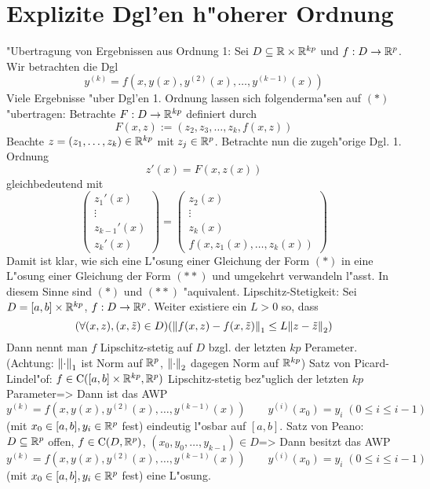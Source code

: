 \section{Explizite Dgl'en h"oherer Ordnung}
\deduction "Ubertragung von Ergebnissen aus Ordnung 1:{
  Sei $D\subseteq\mathbb R\times\mathbb R^{kp}$ und $f:D\to\mathbb R^p$. Wir 
  betrachten die Dgl
  \begin{equation*}
    \tag{*} y^{(k)}=f(x,y(x),y^{(2)}(x),\ldots,y^{(k-1)}(x))
    \end{equation*}
  Viele Ergebnisse "uber Dgl'en 1. Ordnung lassen sich folgenderma"sen auf
  $(*)$ "ubertragen: Betrachte $F:D\to\mathbb R^{kp}$ definiert durch
  \[F(x,z):=(z_2,z_3,\ldots,z_k,f(x,z))
    \]
  Beachte $z=(z_1,\ldots,z_k)\in\mathbb R^{kp}$ mit $z_j\in\mathbb R^p$. 
  Betrachte nun die zugeh"orige Dgl. 1. Ordnung
  \begin{equation*}
    \tag{**} z'(x)=F(x,z(x))
    \end{equation*}
  gleichbedeutend mit
  \[\begin{pmatrix}
      z_1'(x)\\ \vdots \\ z_{k-1}'(x) \\ z_k'(x)
      \end{pmatrix}=
    \begin{pmatrix}
      z_2(x)\\ \vdots \\ z_k(x) \\ f(x,z_1(x),\ldots,z_k(x))
      \end{pmatrix}
    \]
  Damit ist klar, wie sich eine L"osung einer Gleichung der Form $(*)$ 
  in eine L"osung einer Gleichung der Form $(**)$ und umgekehrt verwandeln
  l"asst. In diesem Sinne sind $(*)$ und $(**)$ "aquivalent.
  }
 Lipschitz-Stetigkeit:{
   Sei $D=[a,b]\times\mathbb R^{kp}$, $f:D\to\mathbb R^p$. 
   Weiter existiere ein $L>0$ so, dass
   \[(\forall (x,z),(x,\tilde z)\in D)({\left\| f(x,z)-f(x,\tilde z)\right\|}_1\leq L{\left\| z-\tilde z\right\|}_2)
     \]
   Dann nennt man $f$ Lipschitz-stetig auf $D$ bzgl. der letzten 
   $kp$ Perameter. 
   (Achtung: ${\left\| \cdot\right\|}_1$ ist Norm auf $\mathbb R^p$, ${\left\| \cdot\right\|}_2$ dagegen
   Norm auf $\mathbb R^{kp}$)
   }
\theorem Satz von Picard-Lindel"of:
  $f\in{\rm C}([a,b]\times\mathbb R^{kp},\mathbb R^{p})$ Lipschitz-stetig bez"uglich
  der letzten $kp$ Parameter=>{
  Dann ist das AWP
  \[y^{(k)}=f(x,y(x),y^{(2)}(x),\ldots,y^{(k-1)}(x))\qquad 
    y^{(i)}(x_0)=y_i\;(0\leq i\leq i-1)
    \]
  (mit $x_0\in[a,b],y_i\in\mathbb R^p$ fest) eindeutig l"osbar auf $[a,b]$.
  }
\theorem Satz von Peano:
  $D\subseteq\mathbb R^p$ offen, $f\in{\rm C}(D,\mathbb R^p)$,
  $(x_0,y_0,\ldots,y_{k-1})\in D$=>{
  Dann besitzt das AWP 
  \[y^{(k)}=f(x,y(x),y^{(2)}(x),\ldots,y^{(k-1)}(x))\qquad 
    y^{(i)}(x_0)=y_i\;(0\leq i\leq i-1)
    \]
  (mit $x_0\in[a,b],y_i\in\mathbb R^p$ fest) eine L"osung.
  }
